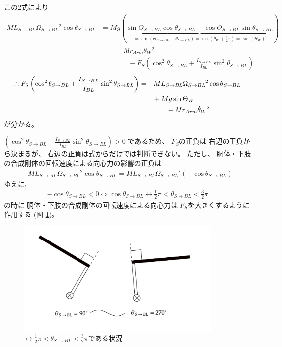 \documentclass[a4paper,11pt]{jsarticle}
\begin{document}
この2式により
\begin{align*}
  ML_{S\rightarrow BL}\Omega_{S\rightarrow BL}{}^2 \cos\theta_{S\rightarrow BL} 
  &= Mg\left(
    \underbrace{
      \sin\Theta_{S\rightarrow BL} \cos\theta_{S\rightarrow BL} - \cos\Theta_{S\rightarrow BL} \sin\theta_{S\rightarrow BL}
    }_{
      =\sin(\Theta_{S\rightarrow BL} - \theta_{S\rightarrow BL})=\sin(\theta_W+\frac{1}{2}\pi)=\sin(\Theta_W)
    }
  \right)
  \\
  & \qquad - Mr_{Arm}\dot{\theta}_W{}^2
  \\
  & \qquad \qquad - F_S\left( \cos^2\theta_{S\rightarrow BL} + \frac{I_{S\rightarrow BL}}{I_{BL}}\sin^2\theta_{S\rightarrow BL} \right)
\end{align*}
\begin{align}
  \therefore
  F_S
  \left( \cos^2\theta_{S\rightarrow BL} + \frac{I_{S\rightarrow BL}}{I_{BL}}\sin^2\theta_{S\rightarrow BL} \right)
  & = -ML_{S\rightarrow BL}\Omega_{S\rightarrow BL}{}^2 \cos\theta_{S\rightarrow BL} 
  \notag
  \\
  & \qquad + Mg \sin\Theta_W
  \notag
  \\
  & \qquad \qquad - Mr_{Arm}\dot{\theta}_W{}^2
  \label{eq:PB:FS_end}
\end{align}
が分かる。

$\left( \cos^2\theta_{S\rightarrow BL} + \frac{I_{S\rightarrow BL}}{I_{BL}}\sin^2\theta_{S\rightarrow BL} \right) > 0$
であるため、
$F_S$の正負は
右辺の正負から決まるが、
右辺の正負は式からだけでは判断できない。
ただし、
胴体・下肢の合成剛体の回転速度による向心力の影響の正負は
\begin{align*}
  -ML_{S\rightarrow BL}\Omega_{S\rightarrow BL}{}^2 \cos\theta_{S\rightarrow BL}
  = ML_{S\rightarrow BL}\Omega_{S\rightarrow BL}{}^2 (-\cos\theta_{S\rightarrow BL})
\end{align*}
ゆえに、
\begin{align*}
  -\cos\theta_{S\rightarrow BL} < 0
  \Leftrightarrow \cos\theta_{S\rightarrow BL} 
  \leftrightarrow \frac{1}{2}\pi < \theta_{S\rightarrow BL} < \frac{3}{2}\pi
\end{align*}
の時に
胴体・下肢の合成剛体の回転速度による向心力は
$F_S$を大きくするように作用する
(図 \ref{centeripetal_force_F_S_positive.png})。

\begin{figure}[h]
  \centering
  \includegraphics[width = 0.9\textwidth]{centeripetal_force_F_S_positive.png}
  \caption{
    $\leftrightarrow \frac{1}{2}\pi < \theta_{S\rightarrow BL} < \frac{3}{2}\pi$である状況
  }
  \label{centeripetal_force_F_S_positive.png}
\end{figure}
\end{document}
